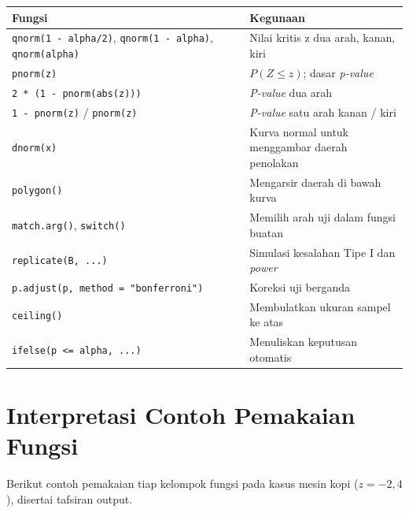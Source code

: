\documentclass[
  indonesian,
  letterpaper,
]{book}
\newcounter{none} %
\begin{document}
{\def\LTcaptype{none} %
\begin{longtable}[]{@{}
  >{\raggedright\arraybackslash}p{}
  >{\raggedright\arraybackslash}p{}@{}}
\toprule\noalign{}
\begin{minipage}[b]{\linewidth}\raggedright
Fungsi
\end{minipage} & \begin{minipage}[b]{\linewidth}\raggedright
Kegunaan
\end{minipage} \\
\midrule\noalign{}
\endhead
\bottomrule\noalign{}
\endlastfoot
\texttt{qnorm(1\ -\ alpha/2)}, \texttt{qnorm(1\ -\ alpha)},
\texttt{qnorm(alpha)} & Nilai kritis z dua arah, kanan, kiri \\
\texttt{pnorm(z)} & \(P(Z \leq z)\); dasar \emph{p-value} \\
\texttt{2\ *\ (1\ -\ pnorm(abs(z)))} & \emph{P-value} dua arah \\
\texttt{1\ -\ pnorm(z)} / \texttt{pnorm(z)} & \emph{P-value} satu arah
kanan / kiri \\
\texttt{dnorm(x)} & Kurva normal untuk menggambar daerah penolakan \\
\texttt{polygon()} & Mengarsir daerah di bawah kurva \\
\texttt{match.arg()}, \texttt{switch()} & Memilih arah uji dalam fungsi
buatan \\
\texttt{replicate(B,\ ...)} & Simulasi kesalahan Tipe I dan
\emph{power} \\
\texttt{p.adjust(p,\ method\ =\ "bonferroni")} & Koreksi uji berganda \\
\texttt{ceiling()} & Membulatkan ukuran sampel ke atas \\
\texttt{ifelse(p\ \textless{}=\ alpha,\ ...)} & Menuliskan keputusan
otomatis \\
\end{longtable}
}

\section{Interpretasi Contoh Pemakaian
Fungsi}\label{interpretasi-contoh-pemakaian-fungsi}

Berikut contoh pemakaian tiap kelompok fungsi pada kasus mesin kopi
(\(z = -2{,}4\)), disertai tafsiran output.
\end{document}
